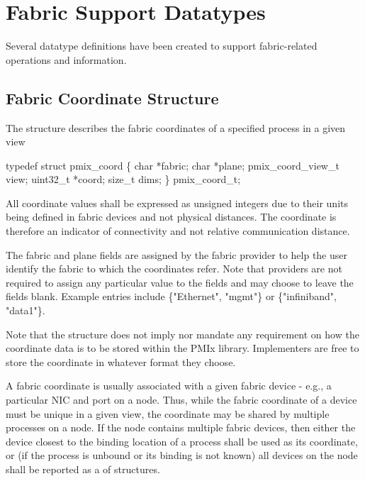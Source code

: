 \section{Fabric Support Datatypes}

Several datatype definitions have been created to support fabric-related operations and information.

\subsection{Fabric Coordinate Structure}

The  structure describes the fabric coordinates of a specified process in a given view

\cspecificstart
\begin{codepar}
typedef struct pmix_coord \{
    char *fabric;
    char *plane;
    pmix_coord_view_t view;
    uint32_t *coord;
    size_t dims;
\} pmix_coord_t;
\end{codepar}
\cspecificend

All coordinate values shall be expressed as unsigned integers due to their units being defined in fabric devices and not physical distances. The coordinate is therefore an indicator of connectivity and not relative communication distance.

The fabric and plane fields are assigned by the fabric provider to help the user identify the fabric to which the coordinates refer. Note that providers are not required to assign any particular value to the fields and may choose to leave the fields blank. Example entries include \{"Ethernet", "mgmt"\} or \{"infiniband", "data1"\}.

\adviceimplstart
Note that the  structure does not imply nor mandate any requirement on how the coordinate data is to be stored within the \ac{PMIx} library. Implementers are free to store the coordinate in whatever format they choose.
\adviceimplend

A fabric coordinate is usually associated with a given fabric device - e.g., a particular \ac{NIC} and port on a node. Thus, while the fabric coordinate of a device must be unique in a given view, the coordinate may be shared by multiple processes on a node. If the node contains multiple fabric devices, then either the device closest to the binding location of a process shall be used as its coordinate, or (if the process is unbound or its binding is not known) all devices on the node shall be reported as a  of  structures.

